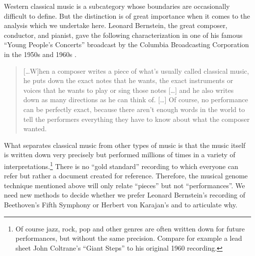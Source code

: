 \documentclass[aoas]{imsart}
\begin{document}
Western classical music is a subcategory
whose boundaries are occasionally difficult to define. But
the distinction is of great importance when it comes to the analysis
which we undertake here. Leonard Bernstein, the great composer,
conductor, and pianist, gave the following characterization in one of his famous
``Young People's Concerts''
broadcast by the Columbia Broadcasting Corporation in the 1950s and
1960s \citep{Bernstein2005}.
\begin{quote}
  [\ldots W]hen a composer
  writes a piece of what's usually called classical music, he puts down
  the exact notes that he wants, the exact instruments or voices that he
  wants to play or sing those notes [\ldots]
  and he also writes down as many directions as
  he can think of. [\ldots] Of course, no performance can be perfectly exact, because there
  aren't enough words in the world to tell the performers everything
  they have to know about what the composer wanted.
\end{quote}
What separates classical music from other types of music is that the
music itself is written down very precisely but performed millions of times in a
variety of interpretations.\footnote{Of course jazz, rock, pop and
  other genres are often written down for future performances, but
  without the same precision. Compare for example a lead sheet John
  Coltrane's ``Giant Steps'' to his original 1960 recording.}
There is no ``gold standard'' recording to
which everyone can refer but rather a document created for
reference. Therefore, the musical genome technique mentioned above
will only relate ``pieces'' but not ``performances''. We need
new methods to decide whether we prefer Leonard Bernstein's
recording of Beethoven's Fifth Symphony or Herbert von Karajan's and
to articulate why.
\end{document}
